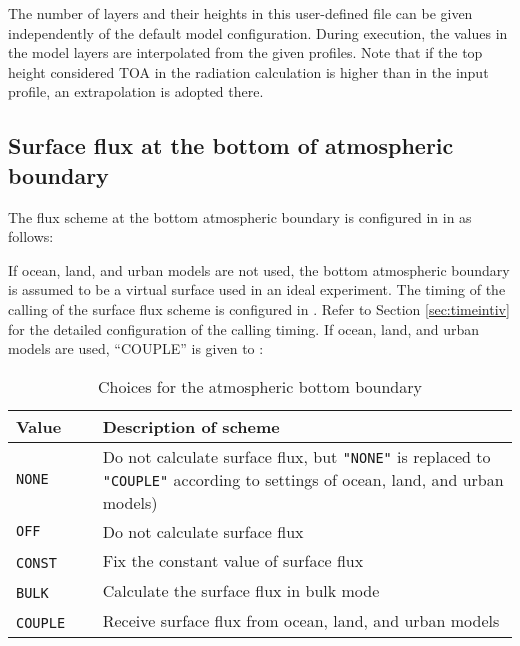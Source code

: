 The number of layers and their heights in this user-defined file can be given independently of the default model configuration. During execution, the values in the model layers are interpolated from the given profiles. Note that if the top height considered TOA in the radiation calculation is higher than in the input profile, an extrapolation is adopted there.



\subsection{Surface flux at the bottom of atmospheric boundary } \label{subsec:basic_usel_surface}
The flux scheme at the bottom atmospheric boundary is configured in  in  as follows:

If ocean, land, and urban models are not used, the bottom atmospheric boundary is assumed to be a virtual surface used in an ideal experiment. The timing of the calling of the surface flux scheme is configured in . Refer to Section \ref{sec:timeintiv} for the detailed configuration of the calling timing. If ocean, land, and urban models are used, ``COUPLE'' is given to :

\begin{table}[htb]
\begin{center}
  \caption{Choices for the atmospheric bottom boundary }
  \label{tab:nml_atm_sf}
  \begin{tabularx}{150mm}{lX} \hline
    \rowcolor[gray]{0.9}  Value & Description of scheme\\ \hline
      \verb|NONE|         & Do not calculate surface flux, but \verb|"NONE"| is replaced to \verb|"COUPLE"| according to settings of ocean, land, and urban models) \\
      \verb|OFF|          & Do not calculate surface flux\\
      \verb|CONST|   　　　& Fix the constant value of surface flux \\
      \verb|BULK|    　　　& Calculate the surface flux in bulk mode \\
      \verb|COUPLE|  　　　& Receive surface flux from ocean, land, and urban models \\
    \hline
  \end{tabularx}
\end{center}
\end{table}

